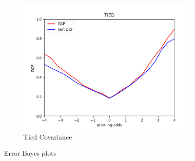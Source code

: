 \begin{figure}[h!]
\begin{subfigure}[b]{0.3\linewidth}
        \includegraphics[width=\linewidth]{Lab/07. Lab 07/Images/03. Tied}
        \caption{Tied Covariance}
        \label{fig:dcfTC}
    \end{subfigure}
    \caption{Error Bayes plots}
    \label{fig:dcfMVGNBTC}
\end{figure}